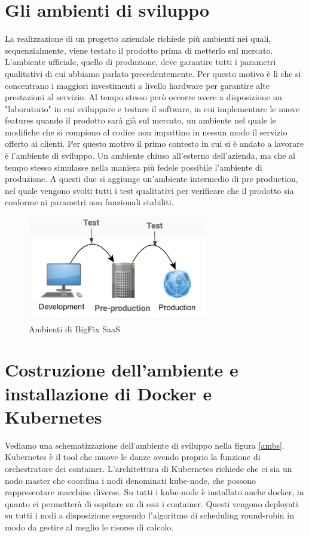 \section{Gli ambienti di sviluppo }
La realizzazione di un progetto aziendale richiede più ambienti nei quali, sequenzialmente, viene testato il prodotto prima di metterlo sul mercato. L'ambiente ufficiale, quello di produzione, deve garantire tutti i parametri qualitativi di cui abbiamo parlato precedentemente. Per questo motivo è lì che si concentrano i maggiori investimenti a livello hardware per garantire alte prestazioni al servizio. Al tempo stesso però occorre avere a disposizione un "laboratorio" in cui sviluppare e testare il software, in cui implementare le nuove features quando il prodotto sarà già sul mercato, un ambiente nel quale le modifiche che si compiono al codice non impattino in nessun modo il servizio offerto ai clienti. Per questo motivo il primo contesto in cui si è andato a lavorare è l'ambiente di sviluppo. Un ambiente chiuso all'esterno dell'azienda, ma che al tempo stesso simulasse nella maniera più fedele possibile l'ambiente di produzione. A questi due si aggiunge un'ambiente intermedio di pre production, nel quale vengono svolti tutti i test qualitativi per verificare che il prodotto sia conforme ai parametri non funzionali stabiliti. 
\begin{figure}[h!]
	\centering
	\includegraphics[width=0.7\textwidth,keepaspectratio=true]{capitoli/imgs/ambientisviluppo.png}
	\caption{Ambienti di BigFix SaaS}
\end{figure}

\section{Costruzione dell'ambiente e installazione di Docker e Kubernetes}
Vediamo una schematizzazione dell'ambiente di sviluppo nella figura \ref{ambs}. Kubernetes è il tool che muove le danze avendo proprio la funzione di orchestratore dei container. L'architettura di Kubernetes richiede che ci sia un nodo master che coordina i nodi denominati kube-node, che possono rappresentare macchine diverse. Su tutti i kube-node è installato anche docker, in quanto ci permetterà di ospitare su di essi i container. Questi vengono deployati su tutti i nodi a disposizione seguendo l'algoritmo di scheduling round-robin in modo da gestire al meglio le risorse di calcolo. 
